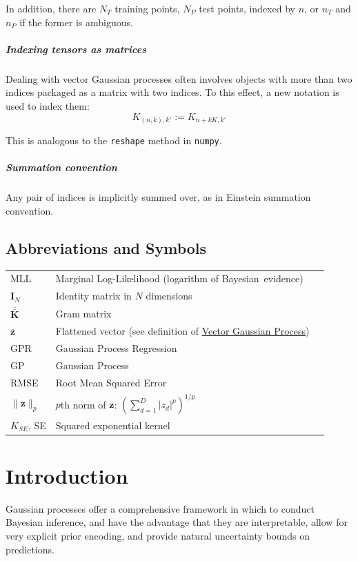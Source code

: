 \documentclass[12pt,a4paper,twoside]{report}
\theoremstyle{definition}
\begin{document}
In addition, there are $N_T$ training points, $N_P$ test points, indexed by $n$, or $n_T$ and $n_P$ if the former is ambiguous.

\paragraph{Indexing tensors as matrices}Dealing with vector Gaussian processes often involves objects with more than two indices packaged as a matrix with two indices. To this effect, a new notation is used to index them:
\begin{equation*}
K_{(n,k),k'}:=K_{n+kK,k'}
\end{equation*}

This is analogous to the \texttt{reshape} method in \texttt{numpy}.

\paragraph{Summation convention}Any pair of indices is implicitly summed over, as in Einstein summation convention.

\section{Abbreviations and Symbols}
\begin{tabular}{p{1.75cm}p{10cm}p{1cm}}
	MLL & \raggedright Marginal Log-Likelihood (logarithm of Bayesian~evidence) & \pageref{MLL}\\
	$\mathbf I_N$ & Identity matrix in $N$ dimensions & \\
	$\mathbf{\overline{\overline K}}$ & Gram matrix & \\
	$\mathbf{\overline z}$ & Flattened vector (see definition of \hyperref[vectorGP]{Vector Gaussian Process})\\
	GPR & Gaussian Process Regression & \\
	GP & Gaussian Process & \\
	RMSE & Root Mean Squared Error & \pageref{RMSE}\\
	$\|\mathbf z\|_p$ & $p$th norm of $\mathbf z$: $\left(\sum_{d=1}^D |z_d|^p\right)^{1/p}$  & \pageref{norm}\\ 
	$K_{SE}$, SE & Squared exponential kernel &\pageref{SE}\\
\end{tabular}


\tableofcontents

\chapter{Introduction}
\label{firstcontentpage}
Gaussian processes offer a comprehensive framework in which to conduct Bayesian inference, and have the advantage that they are interpretable, allow for very explicit prior encoding, and provide natural uncertainty bounds on predictions.
\end{document}
